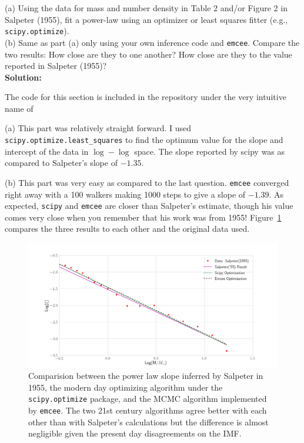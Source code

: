 \documentclass[12pt,usletter,english]{article}
\begin{document}
(a) Using the data for mass and number density in Table 2 and/or
Figure 2 in Salpeter (1955), fit a power-law using an optimizer or
least squares fitter (e.g., \texttt{scipy.optimize}).\\

(b) Same as part (a) only using your own inference code and
\texttt{emcee}.  Compare the two results: How close are they to one
another? How close are they to the value reported in Salpeter (1955)?
\\

\noindent \textbf{Solution:}

The code for this section is included in the repository under the very
intuitive name of 

(a) This part was relatively straight forward. I used
\texttt{scipy.optimize.least\_squares} to find the optimum value for
the slope and intercept of the data in $\log-\log$ space. The slope
reported by scipy was  as compared to Salpeter's slope of
$-1.35$.

(b) This part was very easy as compared to the last
question. \texttt{emcee} converged right away with a 100 walkers
making 1000 steps to give a slope of $-1.39$. As expected,
\texttt{scipy} and \texttt{emcee} are closer than Salpeter's estimate,
though his value comes very close when you remember that his work was
from 1955! Figure~\ref{fig:salp} compares the three results to each
other and the original data used.

\begin{figure}[!h]
  \centering \includegraphics[width=13cm]{salpeter_imf.png}
  \caption{Comparision between the power law slope inferred by
    Salpeter in 1955, the modern day optimizing algorithm under the
    \texttt{scipy.optimize} package, and the MCMC algorithm
    implemented by \texttt{emcee}. The two 21st century algorithms
    agree better with each other than with Salpeter's calculations but
    the difference is almost negligible given the present day
    disagreements on the IMF.
    \label{fig:salp}}
\end{figure}
\end{document}
